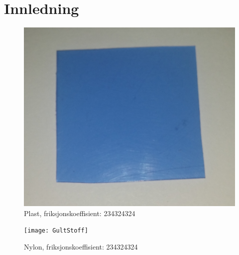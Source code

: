 \documentclass[10pt,a4paper]{report}
\begin{document}
\chapter*{Innledning}
\begin{figure}[p]
    \includegraphics[scale=0.05]{BlaaPlast}
    \caption{Plast, friksjonskoeffisient: 234324324}
    \label{fig:1}
\end{figure}
\begin{figure}[p]
    \texttt{[image: GultStoff]}
    \caption{Nylon, friksjonskoeffisient: 234324324}
    \label{fig:2}
\end{figure}
\end{document}
